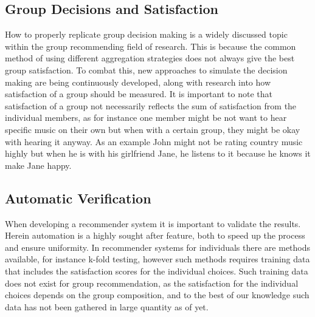 \subsection{Group Decisions and Satisfaction}
How to properly replicate group decision making is a widely discussed topic within the group recommending field of research. This is because the common method of using different aggregation strategies does not always give the best group satisfaction. To combat this, new approaches to simulate the decision making are being continuously developed, along with research into how satisfaction of a group should be measured. It is important to note that satisfaction of a group not necessarily reflects the sum of satisfaction from the individual members, as for instance one member might be not want to hear specific music on their own but when with a certain group, they might be okay with hearing it anyway. As an example John might not be rating country music highly but when he is with his girlfriend Jane, he listens to it because he knows it make Jane happy.

\subsection{Automatic Verification}
When developing a recommender system it is important to validate the results. Herein automation is a highly sought after feature, both to speed up the process and ensure uniformity. In recommender systems for individuals there are methods available, for instance k-fold testing, however such methods requires training data that includes the satisfaction scores for the individual choices. Such training data does not exist for group recommendation, as the satisfaction for the individual choices depends on the group composition, and to the best of our knowledge such data has not been gathered in large quantity as of yet.